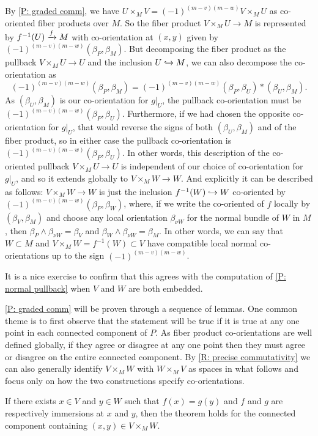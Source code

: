 \begin{example}
	By \cref{P: graded comm}, we have $U \times_M V = (-1)^{(m-v)(m-w)}V \times_M U$ as co-oriented fiber products over $M$.
	So the fiber product $V \times_M U \to M$ is represented by $f^{-1}(U) \xrightarrow{f} M$ with co-orientation at $(x,y)$ given by $(-1)^{(m-v)(m-w)}(\beta_P, \beta_M)$.
	But decomposing the fiber product as the pullback $V \times_M U \to U$ and the inclusion $U \hookrightarrow M$, we can also decompose the co-orientation as
	$$(-1)^{(m-v)(m-w)}(\beta_P, \beta_M) = (-1)^{(m-v)(m-w)}(\beta_P, \beta_U)*(\beta_U, \beta_M).$$
	As $(\beta_U, \beta_M)$ is our co-orientation for $g|_U$, the pullback co-orientation must be $(-1)^{(m-v)(m-w)}(\beta_P, \beta_U)$.
	Furthermore, if we had chosen the opposite co-orientation for $g|_U$, that would reverse the signs of both $(\beta_U, \beta_M)$ and of the fiber product, so in either case the pullback co-orientation is $(-1)^{(m-v)(m-w)}(\beta_P, \beta_U)$.
	In other words, this description of the co-oriented pullback $V \times_M U \to U$ is independent of our choice of co-orientation for $g|_U$, and so it extends globally to $V \times_M W \to W$.
	And explicitly it can be described as follows:
	$V \times_M W \to W$ is just the inclusion $f^{-1}(W) \hookrightarrow W$ co-oriented by $(-1)^{(m-v)(m-w)}(\beta_P, \beta_W)$, where, if we write the co-oriented of $f$ locally by $(\beta_V,\beta_M)$ and choose any local orientation $\beta_{\nu W}$ for the normal bundle of $W$ in $M$, then $\beta_P \wedge \beta_{\nu W} = \beta_V$ and $\beta_W \wedge \beta_{\nu W} = \beta_M$.
	In other words, we can say that $W \subset M$ and $V \times_M W = f^{-1}(W) \subset V$ have compatible local normal co-orientations up to the sign $(-1)^{(m-v)(m-w)}$.

	It is a nice exercise to confirm that this agrees with the computation of \cref{P: normal pullback} when $V$ and $W$ are both embedded.
\end{example}

\cref{P: graded comm} will be proven through a sequence of lemmas.
One common theme is to first observe that the statement will be true if it is true at any one point in each connected component of $P$.
As fiber product co-orientations are well defined globally, if they agree or disagree at any one point then they must agree or disagree on the entire connected component.
By \cref{R: precise commutativity} we can also generally identify $V \times_M W$ with $W \times_M V$ as spaces in what follows and focus only on how the two constructions specify co-orientations.

\begin{lemma}\label{L: im/im}
	If there exists $x \in V$ and $y \in W$ such that $f(x) = g(y)$ and $f$ and $g$ are respectively immersions at $x$ and $y$, then the theorem holds for the connected component containing $(x,y) \in V \times_M W$.
\end{lemma}

